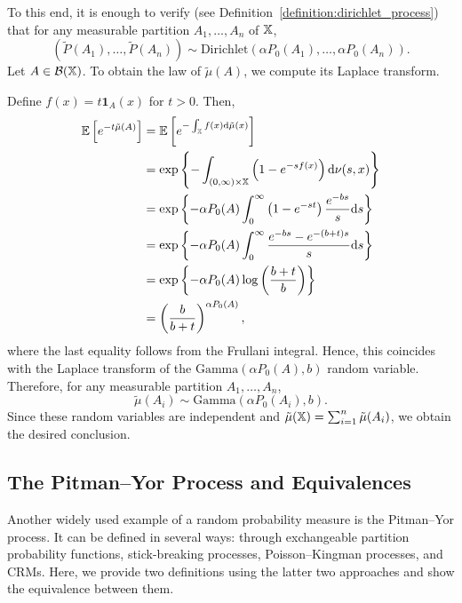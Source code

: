 To this end, it is enough to verify (see Definition~\ref{definition:dirichlet_process}) that for any measurable partition $A_1,\dots,A_n$ of $\mathbb{X}$,
\[
\left( \widetilde{P}(A_1),\dots,\widetilde{P}(A_n)\right) \sim \mathrm{Dirichlet}\left(\alpha P_0(A_1),\dots,\alpha P_0(A_n) \right).
\]
Let $A \in \mathcal{B}(\mathbb{X})$. To obtain the law of $\tilde{\mu}(A)$, we compute its Laplace transform.

Define $f(x) = t \mathbf{1}_A(x)$ for $t > 0$. Then,
\begin{align*}
    \mathbb{E} \left[e^{-t\tilde{\mu}(A)} \right] &= \mathbb{E} \left[e^{-\int_{\mathbb{X}} f(x)\mathrm{d}\tilde{\mu}(x)} \right]\\
    & = \exp \left\{-\int_{(0,\infty)\times \mathbb{X}}\left( 1 - e^{-sf(x)}\right)\mathrm{d}\nu(s,x) \right\}\\
    & = \exp \left\{-\alpha P_0(A)\int_0^\infty \left( 1 - e^{-st}\right)\frac{e^{-bs}}{s}\mathrm{d}s \right\}\\
    & = \exp \left\{-\alpha P_0(A)\int_0^\infty \frac{e^{-bs} - e^{-(b+t)s}}{s}\mathrm{d}s \right\}\\
    & = \exp \left\{-\alpha P_0(A) \log \left( \frac{b+t}{b} \right)\right\}\\
    & = \left( \frac{b}{b+t}\right)^{\alpha P_0(A)},
\end{align*}
where the last equality follows from the Frullani integral. Hence, this coincides with the Laplace transform of the $\mathrm{Gamma}(\alpha P_0(A), b)$ random variable. Therefore, for any measurable partition $A_1,\dots,A_n$,
\[
\tilde{\mu}(A_i) \sim \mathrm{Gamma}\left(\alpha P_0(A_i), b\right).
\]
Since these random variables are independent and $\tilde{\mu}(\mathbb{X}) = \sum_{i = 1}^n \tilde{\mu}(A_i)$, we obtain the desired conclusion.










\subsection{The Pitman--Yor Process and Equivalences}\label{subsection:bnp_toolbox_py_equivalences}

Another widely used example of a random probability measure is the Pitman--Yor process. It can be defined in several ways: through exchangeable partition probability functions, stick-breaking processes, Poisson--Kingman processes, and CRMs. Here, we provide two definitions using the latter two approaches and show the equivalence between them.

